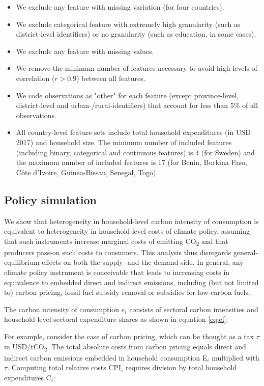 \documentclass[12pt, a4paper]{article}
\begin{document}
\begin{refsection}
\begin{itemize}
    \item We exclude any feature with missing variation (for four countries).
    \item We exclude categorical feature with extremely high granularity (such as district-level identifiers) or no granularity (such as education, in some cases).
    \item We exclude any feature with missing values.
    \item We remove the minimum number of features necessary to avoid high levels of correlation ($r>0.9$) between all features.
    \item We code observations as "other" for each feature (except province-level, district-level and urban-/rural-identifiers) that account for less than 5\% of all observations.
    \item All country-level feature sets include total household expenditures (in USD 2017) and household size. The minimum number of included features (including binary, categorical and continuous features) is 4 (for Sweden) and the maximum number of included features is 17 (for Benin, Burkina Faso, Côte d'Ivoire, Guinea-Bissau, Senegal, Togo).
\end{itemize}

\subsection{Policy simulation}\label{sec:policysimulation}

We show that heterogeneity in household-level carbon intensity of consumption is equivalent to heterogeneity in household-level costs of climate policy, assuming that such instruments increase marginal costs of emitting CO\textsubscript{2} and that producers pass-on such costs to consumers. This analysis thus disregards general-equilibrium-effects on both the supply- and the demand-side. In general, any climate policy instrument is conceivable that leads to increasing costs in equivalence to embedded direct and indirect emissions, including (but not limited to) carbon pricing, fossil fuel subsidy removal or subsidies for low-carbon fuels.

The carbon intensity of consumption $e_{i}$ consists of sectoral carbon intensities and household-level sectoral expenditure shares as shown in equation \ref{eq:ei}. 

For example, consider the case of carbon pricing, which can be thought as a tax $\tau$ in USD/tCO\textsubscript{2}. The total absolute costs from carbon pricing equals direct and indirect carbon emissions embedded in household consumption E$_{i}$ multiplied with $\tau$. Computing total relative costs CPI$_{i}$ requires division by total household expenditures C$_{i}$:


\end{refsection}
\end{document}
